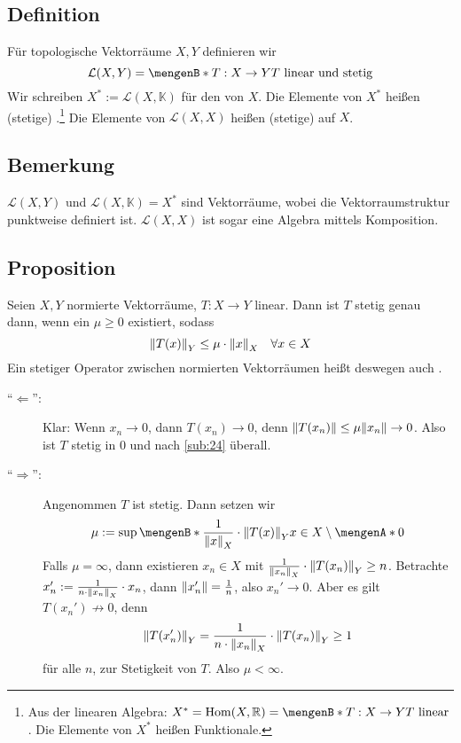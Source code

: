 \subsection[Definition: Stetige Funktionale und Operatoren]{Definition} %
\label{sub:25}
Für topologische Vektorräume $X,Y$ definieren wir 
\[
	\mathcal{L}(X,Y) = \set[T : X \to Y]{T \text{ linear und stetig}}  
\]
Wir schreiben $X^*:= \mathcal{L}(X,\mathds{K})$ für den  von $X$. Die Elemente von $X^*$ heißen (stetige) .\footnote{Aus der linearen Algebra: $X^* = \Hom(X,\mathds{R}) = \set[T : X \to Y]{T \text{ linear}}$. Die Elemente von $X^*$ heißen Funktionale.}
Die Elemente von $\mathcal{L}(X,X)$ heißen (stetige)  auf $X$. 

\subsection[Bemerkung: Vektorraumstruktur auf $\mathcal{L}(X,Y)$, Algebrastruktur auf $\mathcal{L}(X,X)$]{Bemerkung} %
\label{sub:26}
$\mathcal{L}(X,Y)$ und $\mathcal{L}(X,\mathds{K}) = X^*$ sind Vektorräume, wobei die Vektorraumstruktur punktweise definiert ist. $\mathcal{L}(X,X)$ ist sogar eine Algebra mittels Komposition.

\subsection[Proposition: Stetigkeit linearer Abbildungen mittels Normabschätzung]{Proposition} %
\label{sub:27}
Seien $X,Y$ normierte Vektorräume, $T : X \to Y$ linear. Dann ist $T$ stetig genau dann, wenn ein $\mu \ge 0$ existiert, sodass 
\[
	\norm[Y]{T(x)} \le \mu \cdot \norm[X]{x} \quad \forall x \in X  
\]
Ein stetiger Operator zwischen normierten Vektorräumen heißt deswegen auch .
\begin{description}
	\item[\enquote{$\Leftarrow$}:] Klar: Wenn $x_n \to 0$, dann $T(x_n) \to 0$, denn $\norm{T(x_n)} \le \mu \norm{x_n } \to 0$. Also ist $T$ stetig in $0$ und nach
	\ref{sub:24} überall.
	\item[\enquote{$\Rightarrow $}:] Angenommen $T$ ist stetig. Dann setzen wir
	\[
		\mu := \sup \set[{\frac{1}{\norm[X]{x}} \cdot \norm[Y]{T(x)}  }]{x \in X \setminus \set{0} } 
	\] 
	Falls $\mu = \infty$, dann existieren $x_n \in X$ mit $\frac{1}{\norm[X]{x_n}} \cdot \norm[Y]{T(x_n)} \ge n$. Betrachte 
	$x_n' :=  \frac{1}{n \cdot \norm[X]{x_n}} \cdot x_n $, dann $\norm{x_n'} = \frac{1}{n}$, also $x_n' \to 0$. Aber es gilt $T(x_n')\not\longrightarrow 0$, denn
	\begin{align*}
		\norm[Y]{T(x_n')} = \frac{1}{n \cdot \norm[X]{x_n} } \cdot \norm[Y]{T(x_n)} \ge 1 
	\end{align*}
	für alle $n$, \light zur Stetigkeit von $T$. Also $\mu < \infty$. \bewende {}
\end{description}

